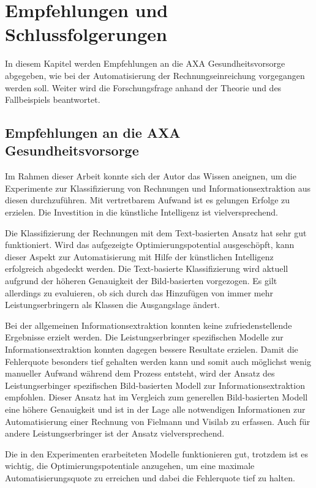 \section{Empfehlungen und Schlussfolgerungen}
\label{chap:summary}

In diesem Kapitel werden Empfehlungen an die AXA Gesundheitsvorsorge abgegeben, wie bei der Automatisierung der Rechnungseinreichung vorgegangen werden soll. Weiter wird die Forschungsfrage anhand der Theorie und des Fallbeispiels beantwortet.

\subsection{Empfehlungen an die AXA Gesundheitsvorsorge}

Im Rahmen dieser Arbeit konnte sich der Autor das Wissen aneignen, um die Experimente zur Klassifizierung von Rechnungen und Informationsextraktion aus diesen durchzuführen. Mit vertretbarem Aufwand ist es gelungen Erfolge zu erzielen. Die Investition in die künstliche Intelligenz ist vielversprechend.

Die Klassifizierung der Rechnungen mit dem Text-basierten Ansatz hat sehr gut funktioniert. Wird das aufgezeigte Optimierungspotential ausgeschöpft, kann dieser Aspekt zur Automatisierung mit Hilfe der künstlichen Intelligenz erfolgreich abgedeckt werden. Die Text-basierte Klassifizierung wird aktuell aufgrund der höheren Genauigkeit der Bild-basierten vorgezogen. Es gilt allerdings zu evaluieren, ob sich durch das Hinzufügen von immer mehr Leistungserbringern als Klassen die Ausgangslage ändert.

Bei der allgemeinen Informationsextraktion konnten keine zufriedenstellende Ergebnisse erzielt werden. Die Leistungserbringer spezifischen Modelle zur Informationsextraktion konnten dagegen bessere Resultate erzielen. Damit die Fehlerquote besonders tief gehalten werden kann und somit auch möglichst wenig manueller Aufwand während dem Prozess entsteht, wird der Ansatz des Leistungserbinger spezifischen Bild-basierten Modell zur Informationsextraktion empfohlen. Dieser Ansatz hat im Vergleich zum generellen Bild-basierten Modell eine höhere Genauigkeit und ist in der Lage alle notwendigen Informationen zur Automatisierung einer Rechnung von Fielmann und Visilab zu erfassen. Auch für andere Leistungserbringer ist der Ansatz vielversprechend.

Die in den Experimenten erarbeiteten Modelle funktionieren gut, trotzdem ist es wichtig, die Optimierungspotentiale anzugehen, um eine maximale Automatisierungsquote zu erreichen und dabei die Fehlerquote tief zu halten.

